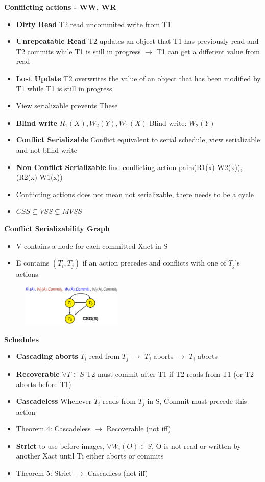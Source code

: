 \documentclass[10pt, landscape]{article}
\begin{document}
\begin{multicols}{4}
\textbf{Conflicting actions - WW, WR} \\
\begin{itemize}
  \item \textbf{Dirty Read} T2 read uncommited write from T1
  \item \textbf{Unrepeatable Read} T2 updates an object that T1 has previously read and T2 commits while T1 is still in progress $\rightarrow$ T1 can get a different value from read
  \item \textbf{Lost Update} T2 overwrites the value of an object that has been modified by T1 while T1 is still in progress
  \item View serializable prevents These
  \item \textbf{Blind write} $R_1(X), W_2(Y) , W_1(X)$ Blind write: $W_2(Y)$
  \item \textbf{Conflict Serializable} Conflict equivalent to serial schedule, view serializable and not blind write
  \item \textbf{Non Conflict Serializable} find conflicting action pairs(R1(x) W2(x)), (R2(x) W1(x))  
  \item Conflicting actions does not mean not serializable, there needs to be a cycle
  \item \textbf{$CSS \subsetneq VSS \subsetneq MVSS$} 
\end{itemize}

\textbf{Conflict Serializability Graph} \\
\begin{itemize}
  \item V contains a node for each committed Xact in S
  \item E contains $(T_i, T_j)$ if an action precedes and conflicts with one of $T_j$'s actions
\end{itemize}
\includegraphics[width=7cm, height =2cm]{csg.png}

\textbf{Schedules} \\
\begin{itemize} 
  \item \textbf{Cascading aborts} $T_i$ read from $T_j$ $\rightarrow$ $T_j$ aborts $\rightarrow$ $T_i$ aborts
  \item \textbf{Recoverable} $\forall T \in S$ T2 must commit after T1 if T2 reads from T1 (or T2 aborts before T1)
  \item \textbf{Cascadeless} Whenever $T_i$ reads from $T_j$ in S, Commit must precede this action
  \item Theorem 4: Cascadeless $\rightarrow$ Recoverable (not iff)
  \item \textbf{Strict}  to use before-images, $\forall W_i(O) \in S$, O is not read or written by another Xact until Ti either aborts or commits
  \item Theorem 5: Strict $\rightarrow$ Cascadless (not iff)
\end{itemize}


\end{multicols}
\end{document}
